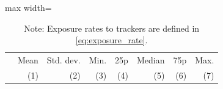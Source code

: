 \begin{table}[ht]
\centering
\small
\setlength\tabcolsep{12 pt}
\setlength{\defaultaddspace}{0pt}
\def\sym#1{\ifmmode^{#1}\else\(^{#1}\)\fi}
\caption{Summary of exposure rate}
\label{tab:exposure-rate}
\begin{adjustbox}{max width=\textwidth}
\begin{tabular}{@{\hspace{0\tabcolsep}}lrrrrrrr@{\hspace{0\tabcolsep}}}
    \toprule\toprule
    & Mean & Std. dev. & Min. & 25p & Median & 75p & Max.\\
    &\multicolumn{1}{r}{(1)}         &\multicolumn{1}{r}{(2)}         &\multicolumn{1}{r}{(3)}         &\multicolumn{1}{r}{(4)}         &\multicolumn{1}{r}{(5)}         &\multicolumn{1}{r}{(6)}         &\multicolumn{1}{r}{(7)}\\
    \midrule
    
   \bottomrule
\end{tabular}
\end{adjustbox}
\caption*{\footnotesize Note:
    Exposure rates to trackers are defined in \cref{eq:exposure_rate}.
}
\end{table}